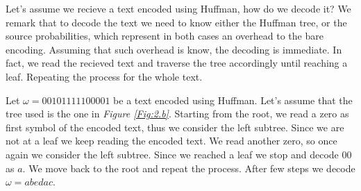 \documentclass{subfiles}
\begin{document}
    Let's assume we recieve a text encoded using Huffman, how do we decode it?
    We remark that to decode the text we need to know either the Huffman tree, 
        or the source probabilities, which represent in both cases an overhead
        to the bare encoding.
    Assuming that such overhead is know, the decoding is immediate.
    In fact, we read the recieved text and traverse the tree accordingly 
    until reaching a leaf. Repeating the process for the whole text.

    \begin{example*}
        Let \(\omega = 00101111100001\) be a text encoded using Huffman.
        Let's assume that the tree used is the one in \emph{Figure \ref{Fig:2.b}}.
        Starting from the root, we read a zero as first symbol of the encoded text,
        thus we consider the left subtree. 
        Since we are not at a leaf we keep reading the encoded text.
        We read another zero, so once again we consider the left subtree.
        Since we reached a leaf we stop and decode \(00\) as \(a\). 
        We move back to the root and repeat the process. 
        After few steps we decode \(\omega = abedac\).
    \end{example*}
\end{document}

